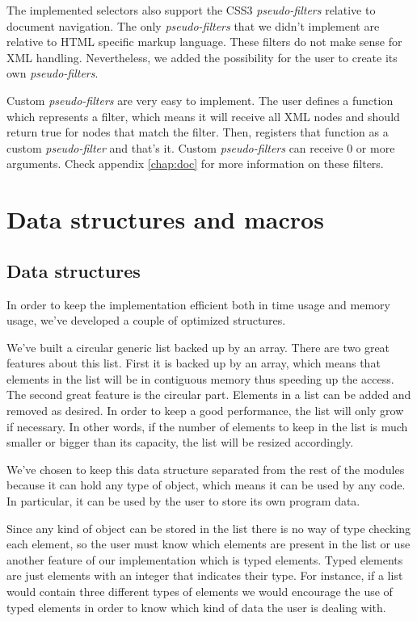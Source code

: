 \documentclass[a4paper]{report}
\begin{document}
		The implemented selectors also support  the CSS3 \emph{pseudo-filters} relative to document navigation. The only \emph{pseudo-filters} that  we didn't implement are relative to HTML specific markup language. 
		These filters do not make sense for XML handling. Nevertheless, we added the possibility for the user to create its own \emph{pseudo-filters}.
		
		Custom \emph{pseudo-filters} are very easy to implement. The user defines a function which represents a filter, which means it will receive all XML nodes and should return true for nodes that match the filter.
		Then, registers that function as a custom \emph{pseudo-filter} and that's it. Custom \emph{pseudo-filters} can receive 0 or more arguments. Check appendix \ref{chap:doc} for more information on these filters.
			
\section{Data structures and macros}\label{sec:helpers}

	\subsection{Data structures}
		In order to keep the implementation efficient both in time usage and memory usage, we've developed a couple of optimized structures. 
		
		We've built a circular generic list backed up by an array. There are two great features about this list. First it is backed up by an array, which means that elements in the list will be in contiguous memory thus speeding
		up the access. The second great feature is the circular part. Elements in a list can be added and removed as desired. In order to keep a good performance, the list will only grow if necessary. In other words, if the 
		number of elements to keep in the list is much smaller or bigger than its capacity, the list will be resized accordingly.
		
		We've chosen to keep this data structure separated from the rest of the modules because it can hold any type of object, which means it can be used by any code. In particular, it can be used by the user to store its
		own program data.
		
		Since any kind of object can be stored in the list there is no way of type checking each element, so the user must know which elements are present in the list or use another feature of our implementation which is typed 
		elements. Typed elements are just elements with an integer that indicates their type. For instance, if a list would contain three different types of elements we would encourage the use of typed elements in order 
		to know which kind of data the user is dealing with.
		
\end{document}
